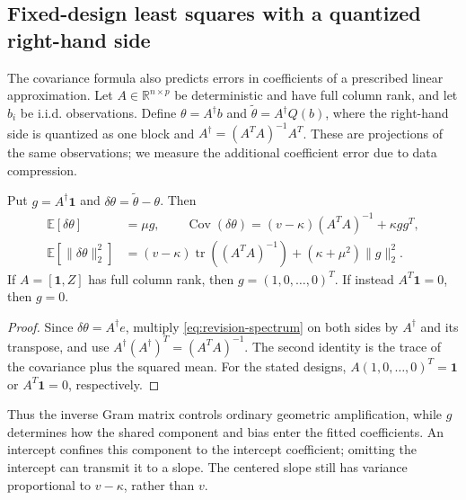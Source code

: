 \subsection{Fixed-design least squares with a quantized right-hand side}
\label{sec:revision-ls}
The covariance formula also predicts errors in coefficients of a prescribed
linear approximation. Let $A\in\mathbb R^{n\times p}$ be deterministic and
have full column rank, and let $b_i$ be i.i.d. observations. Define
$\theta=A^\dagger b$ and $\widetilde\theta=A^\dagger Q(b)$, where the
right-hand side is quantized as one block and
$A^\dagger=(A^TA)^{-1}A^T$. These are projections of the same observations;
we measure the additional coefficient error due to data compression.

\begin{corollary}
\label{cor:revision-ls}
Put $g=A^\dagger\mathbf1$ and $\delta\theta=\widetilde\theta-\theta$. Then
\begin{align}
 \mathbb E[\delta\theta]&=\mu g,\qquad
 \operatorname{Cov}(\delta\theta)
 =(v-\kappa)(A^TA)^{-1}+\kappa gg^T,\label{eq:revision-ls-cov}\\
 \mathbb E[\|\delta\theta\|_2^2]
 &=(v-\kappa)\operatorname{tr}((A^TA)^{-1})
       +(\kappa+\mu^2)\|g\|_2^2.\label{eq:revision-ls-mse}
\end{align}
If $A=[\mathbf1,Z]$ has full column rank, then $g=(1,0,\ldots,0)^T$.
If instead $A^T\mathbf1=0$, then $g=0$.
\end{corollary}
\begin{proof}
Since $\delta\theta=A^\dagger e$, multiply
\eqref{eq:revision-spectrum} on both sides by $A^\dagger$ and its transpose,
and use $A^\dagger(A^\dagger)^T=(A^TA)^{-1}$. The second identity is the
trace of the covariance plus the squared mean. For the stated designs,
$A(1,0,\ldots,0)^T=\mathbf1$ or $A^T\mathbf1=0$, respectively.
\end{proof}

Thus the inverse Gram matrix controls ordinary geometric amplification,
while $g$ determines how the shared component and bias enter the fitted
coefficients. An intercept confines this component to the intercept
coefficient; omitting the intercept can transmit it to a slope. The centered
slope still has variance proportional to $v-\kappa$, rather than $v$.

